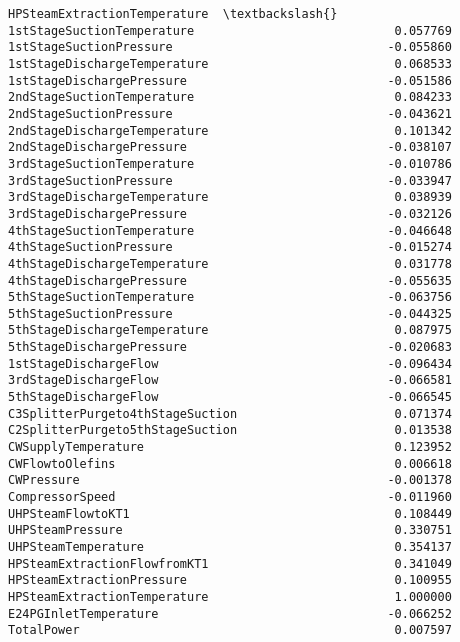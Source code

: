 \documentclass[11pt]{article}
\begin{document}
\begin{tcolorbox}[breakable, size=fbox, boxrule=.5pt, pad at break*=1mm, opacityfill=0]
\begin{Verbatim}[commandchars=\\\{\}]
                                  HPSteamExtractionTemperature  \textbackslash{}
1stStageSuctionTemperature                            0.057769
1stStageSuctionPressure                              -0.055860
1stStageDischargeTemperature                          0.068533
1stStageDischargePressure                            -0.051586
2ndStageSuctionTemperature                            0.084233
2ndStageSuctionPressure                              -0.043621
2ndStageDischargeTemperature                          0.101342
2ndStageDischargePressure                            -0.038107
3rdStageSuctionTemperature                           -0.010786
3rdStageSuctionPressure                              -0.033947
3rdStageDischargeTemperature                          0.038939
3rdStageDischargePressure                            -0.032126
4thStageSuctionTemperature                           -0.046648
4thStageSuctionPressure                              -0.015274
4thStageDischargeTemperature                          0.031778
4thStageDischargePressure                            -0.055635
5thStageSuctionTemperature                           -0.063756
5thStageSuctionPressure                              -0.044325
5thStageDischargeTemperature                          0.087975
5thStageDischargePressure                            -0.020683
1stStageDischargeFlow                                -0.096434
3rdStageDischargeFlow                                -0.066581
5thStageDischargeFlow                                -0.066545
C3SplitterPurgeto4thStageSuction                      0.071374
C2SplitterPurgeto5thStageSuction                      0.013538
CWSupplyTemperature                                   0.123952
CWFlowtoOlefins                                       0.006618
CWPressure                                           -0.001378
CompressorSpeed                                      -0.011960
UHPSteamFlowtoKT1                                     0.108449
UHPSteamPressure                                      0.330751
UHPSteamTemperature                                   0.354137
HPSteamExtractionFlowfromKT1                          0.341049
HPSteamExtractionPressure                             0.100955
HPSteamExtractionTemperature                          1.000000
E24PGInletTemperature                                -0.066252
TotalPower                                            0.007597


\end{Verbatim}
\end{tcolorbox}
\end{document}
